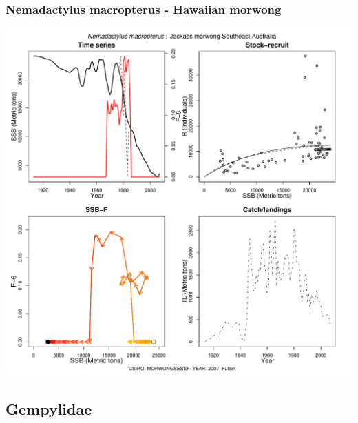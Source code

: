 \subsubsection{Nemadactylus macropterus - Hawaiian morwong}
\begin{center}
\includegraphics[width=1.2\textwidth]{../R/figures/CSIRO-MORWONGSESSF-YEAR-2007-Fulton.pdf}
\end{center}

\subsection{Gempylidae}

